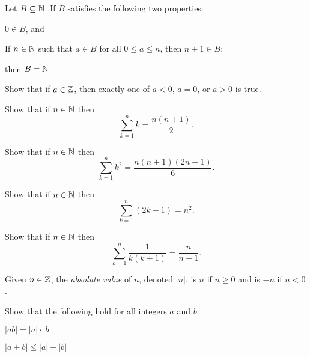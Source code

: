 \begin{cor}
Let \(B \subseteq \mathbb{N}\). If \(B\) satisfies the following two properties:
\begin{proplist}
\item \(0 \in B\), and
\item If \(n \in \mathbb{N}\) such that \(a \in B\) for all \(0 \leq a \leq n\), then \(n+1 \in B\);
\end{proplist}
then \(B = \mathbb{N}\).
\end{cor}



\Exercises%

\begin{exercise}[Trichotomy.]
Show that if \(a \in \mathbb{Z}\), then exactly one of \(a < 0\), \(a = 0\), or \(a > 0\) is true.
\end{exercise}

\begin{exercise}
Show that if $n \in \mathbb{N}$ then \[ \sum_{k=1}^n k = \frac{n(n+1)}{2}. \]
\end{exercise}

\begin{exercise}
Show that if $n \in \mathbb{N}$ then \[ \sum_{k=1}^n k^2 = \frac{n(n+1)(2n+1)}{6}. \]
\end{exercise}

\begin{exercise}
Show that if $n \in \mathbb{N}$ then \[ \sum_{k=1}^n (2k - 1) = n^2. \]
\end{exercise}

\begin{exercise}
Show that if $n \in \mathbb{N}$ then \[ \sum_{k=1}^n \frac{1}{k(k+1)} = \frac{n}{n+1}. \]
\end{exercise}

\begin{dfn}
Given \(n \in \mathbb{Z}\), the \emph{absolute value} of \(n\), denoted \(|n|\), is \(n\) if \(n \geq 0\) and is \(-n\) if \(n < 0\).
\end{dfn}

\begin{exercise}
Show that the following hold for all integers $a$ and $b$.
\begin{proplist}
\item \(|ab| = |a| \cdot |b|\)
\item \(|a+b| \leq |a| + |b|\)
\end{proplist}
\end{exercise}
